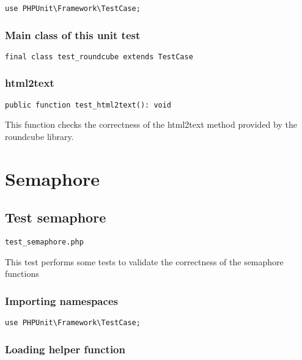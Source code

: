 \documentclass[a4paper]{article}
\begin{document}
\begin{lstlisting}
use PHPUnit\Framework\TestCase;
\end{lstlisting}

\hypertarget{toc353}{}
\subsubsection{Main class of this unit test}

\begin{lstlisting}
final class test_roundcube extends TestCase
\end{lstlisting}

\hypertarget{toc354}{}
\subsubsection{html2text}

\begin{lstlisting}
public function test_html2text(): void
\end{lstlisting}

This function checks the correctness of the html2text method provided by the
roundcube library.


\hypertarget{toc355}{}
\section{Semaphore}

\hypertarget{toc356}{}
\subsection{Test semaphore}

\begin{lstlisting}
test_semaphore.php
\end{lstlisting}

This test performs some tests to validate the correctness
of the semaphore functions

\hypertarget{toc357}{}
\subsubsection{Importing namespaces}

\begin{lstlisting}
use PHPUnit\Framework\TestCase;
\end{lstlisting}

\hypertarget{toc358}{}
\subsubsection{Loading helper function}
\end{document}
